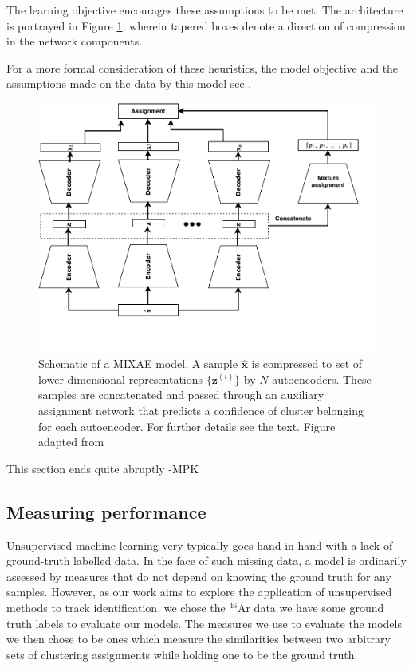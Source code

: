 \documentclass[review,number,sort&compress]{elsarticle}
\begin{document}
\noindent The learning objective encourages these assumptions to be met. The architecture is portrayed in Figure \ref{fig:mixae}, wherein tapered boxes denote a direction of compression in the network components.

For a more formal consideration of these heuristics, the model objective and the assumptions made on the data by this model see \citet{Zhang}.

\begin{figure}[tb]
	\centering
	\includegraphics[width=.8\textwidth]{plots/mixae.pdf}
	\caption[Mixture of autoencoders schematic]{Schematic of a MIXAE model. A sample $\hat{\boldsymbol{x}}$ is compressed to set of lower-dimensional representations $\{\boldsymbol{z}^{(i)}\}$ by $N$ autoencoders. These samples are concatenated and passed through an auxiliary assignment network that predicts a confidence of cluster belonging for each autoencoder. For further details see the text. Figure adapted from \citet{Zhang}}
	\label{fig:mixae}
\end{figure}
{\color{blue} This section ends quite abruptly -MPK}


\subsection{Measuring performance}
Unsupervised machine learning very typically goes hand-in-hand with a lack of ground-truth labelled data. In the face of such missing data, a model is ordinarily assessed by measures that do not depend on knowing the ground truth for any samples. 
However, as our work aims to explore the application of unsupervised methods to track identification, we chose the ${}^{46}$Ar data we have some ground truth labels to evaluate our models. The measures we use to evaluate the models we then chose to be ones which measure the similarities between two arbitrary sets of clustering assignments while holding one to be the ground truth. 
\end{document}
